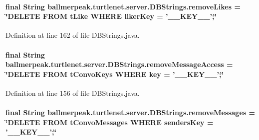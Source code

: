 \hypertarget{classballmerpeak_1_1turtlenet_1_1server_1_1DBStrings_a93fcbcf4eaf96862a3db95dec6b1fbcb}{
\paragraph[{remove\-Likes}]{\setlength{\rightskip}{0pt plus 5cm}final String ballmerpeak.\-turtlenet.\-server.\-D\-B\-Strings.\-remove\-Likes = \char`\"{}D\-E\-L\-E\-T\-E F\-R\-O\-M t\-Like W\-H\-E\-R\-E liker\-Key = '\-\_\-\-\_\-\-K\-E\-Y\-\_\-\-\_\-';\char`\"{}\hspace{0.3cm}{\ttfamily [static]}}}\label{classballmerpeak_1_1turtlenet_1_1server_1_1DBStrings_a93fcbcf4eaf96862a3db95dec6b1fbcb}


Definition at line 162 of file D\-B\-Strings.\-java.

\hypertarget{classballmerpeak_1_1turtlenet_1_1server_1_1DBStrings_aa376b74543195cc63ee7e443131d2822}{
\paragraph[{remove\-Message\-Access}]{\setlength{\rightskip}{0pt plus 5cm}final String ballmerpeak.\-turtlenet.\-server.\-D\-B\-Strings.\-remove\-Message\-Access = \char`\"{}D\-E\-L\-E\-T\-E F\-R\-O\-M t\-Convo\-Keys W\-H\-E\-R\-E key = '\-\_\-\-\_\-\-K\-E\-Y\-\_\-\-\_\-';\char`\"{}\hspace{0.3cm}{\ttfamily [static]}}}\label{classballmerpeak_1_1turtlenet_1_1server_1_1DBStrings_aa376b74543195cc63ee7e443131d2822}


Definition at line 156 of file D\-B\-Strings.\-java.

\hypertarget{classballmerpeak_1_1turtlenet_1_1server_1_1DBStrings_a1b06410e67831509b9f39c59360cd3a4}{
\paragraph[{remove\-Messages}]{\setlength{\rightskip}{0pt plus 5cm}final String ballmerpeak.\-turtlenet.\-server.\-D\-B\-Strings.\-remove\-Messages = \char`\"{}D\-E\-L\-E\-T\-E F\-R\-O\-M t\-Convo\-Messages W\-H\-E\-R\-E senders\-Key = '\-\_\-\-\_\-\-K\-E\-Y\-\_\-\-\_\-';\char`\"{}\hspace{0.3cm}{\ttfamily [static]}}}\label{classballmerpeak_1_1turtlenet_1_1server_1_1DBStrings_a1b06410e67831509b9f39c59360cd3a4}


